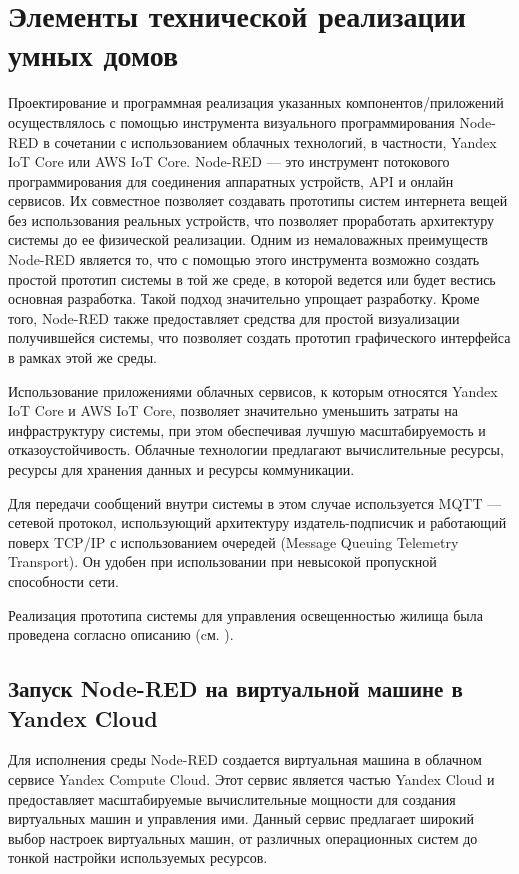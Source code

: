 \section{Элементы технической реализации умных домов}
\label{sec_SH_tec_impl}
Проектирование и программная реализация указанных компонентов/приложений осуществлялось с помощью инструмента  визуального программирования Node-RED  в сочетании с использованием облачных технологий, в частности, Yandex IoT Core  или AWS IoT Core. Node-RED  — это инструмент потокового программирования для соединения аппаратных устройств, API и онлайн сервисов. Их совместное позволяет создавать прототипы систем интернета вещей без использования реальных устройств, что позволяет проработать архитектуру системы до ее физической реализации.  Одним из немаловажных преимуществ Node-RED является то, что с помощью этого инструмента возможно создать простой прототип системы в той же среде, в которой ведется или будет вестись основная разработка. Такой подход значительно упрощает разработку. Кроме того, Node-RED также предоставляет средства для простой визуализации получившейся системы, что позволяет создать прототип графического интерфейса в рамках этой же среды.

Использование приложениями облачных сервисов, к которым относятся Yandex IoT Core  и AWS IoT Core, позволяет значительно уменьшить затраты на инфраструктуру системы, при этом обеспечивая лучшую масштабируемость и отказоустойчивость. Облачные технологии предлагают вычислительные ресурсы, ресурсы для хранения данных и ресурсы коммуникации.

Для передачи сообщений внутри системы в этом случае используется MQTT   — сетевой протокол, использующий архитектуру издатель-подписчик и работающий поверх TCP/IP с использованием очередей (Message Queuing Telemetry Transport). Он удобен при использовании при невысокой  пропускной способности сети.

Реализация прототипа системы для управления освещенностью
жилища была проведена согласно описанию (cм. ).

\subsection{Запуск Node-RED на виртуальной машине в Yandex Cloud}
Для исполнения среды Node-RED создается виртуальная машина в облачном сервисе Yandex Compute Cloud. Этот сервис является частью Yandex Cloud и предоставляет масштабируемые вычислительные мощности для создания виртуальных машин и управления ими. Данный сервис предлагает широкий выбор настроек виртуальных машин, от различных операционных систем до тонкой настройки используемых ресурсов.

